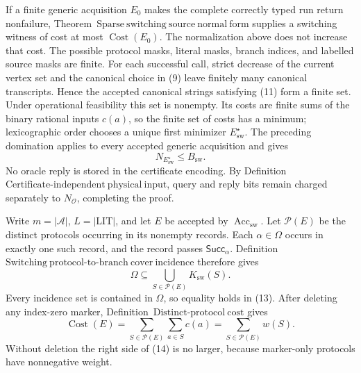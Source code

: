 If a finite generic acquisition \(E_0\) makes the complete correctly typed run return nonfailure, Theorem~\(\mathrm{Sparse\ switching\ source\ normal\ form}\) supplies a switching witness of cost at most \(\operatorname{Cost}(E_0)\).  The normalization above does not increase that cost.  The possible protocol masks, literal masks, branch indices, and labelled source masks are finite.  For each successful call, strict decrease of the current vertex set and the canonical choice in (9) leave finitely many canonical transcripts.  Hence the accepted canonical strings satisfying (11) form a finite set.  Under operational feasibility this set is nonempty.  Its costs are finite sums of the binary rational inputs \(c(a)\), so the finite set of costs has a minimum; lexicographic order chooses a unique first minimizer \(E_{\mathrm{sw}}^{\star}\).  The preceding domination applies to every accepted generic acquisition and gives
\[
 N_{E_{\mathrm{sw}}^{\star}}\leq B_{\mathrm{sw}}.
 \tag{12}
\]
No oracle reply is stored in the certificate encoding.  By Definition~\(\mathrm{Certificate\mbox{-}independent\ physical\ input}\), query and reply bits remain charged separately to \(N_{\mathcal O}\), completing the proof.

Write \(m=|\mathcal A|\), \(L=|\mathrm{LIT}|\), and let \(E\) be accepted by \(\operatorname{Acc}_{\mathrm{sw}}\).  Let \(\mathcal P(E)\) be the distinct protocols occurring in its nonempty records.  Each \(\alpha\in\Omega\) occurs in exactly one such record, and the record passes \(\mathsf{Succ}_{\alpha}\).  Definition~\(\mathrm{Switching\ protocol\mbox{-}to\mbox{-}branch\ cover\ incidence}\) therefore gives
\[
 \Omega\subseteq\bigcup_{S\in\mathcal P(E)}K_{\mathrm{sw}}(S).
 \tag{13}
\]
Every incidence set is contained in \(\Omega\), so equality holds in (13).  After deleting any index-zero marker, Definition~\(\mathrm{Distinct\mbox{-}protocol\ cost}\) gives
\[
 \operatorname{Cost}(E)
 =\sum_{S\in\mathcal P(E)}\sum_{a\in S}c(a)
 =\sum_{S\in\mathcal P(E)}w(S).
 \tag{14}
\]
Without deletion the right side of (14) is no larger, because marker-only protocols have nonnegative weight.

